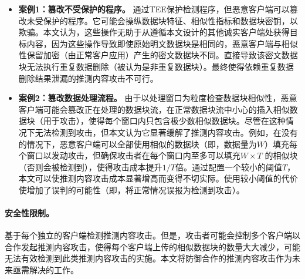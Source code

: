 \begin{itemize}[leftmargin=*]
    \item \textbf{案例1：篡改不受保护的程序。}
    \sysnameF 通过TEE保护检测程序，但恶意客户端可以篡改未受保护的程序。它可能会操纵数据块特征、相似性指标和数据块密钥，以欺骗\sysnameF。本文认为，这些操作无助于从遵循本文设计的其他诚实客户端处获得目标内容，因为这些操作导致即使原始明文数据块是相同的，恶意客户端与相似性保留加密（由正常客户应用）产生的密文数据块不同。直接导致该密文数据块无法执行重复数据删除（被认为是非重复数据块）。最终使得依赖重复数据删除结果泄漏的推测内容攻击不可行。
    \item \textbf{案例2：篡改数据处理流程。}
    由于\sysnameF 以处理窗口为粒度检查数据块相似性，恶意客户端可能会篡改正在处理的数据块流，在正常数据块流中小心的插入相似数据块（用于攻击），使得每个窗口内只包含极少数相似数据块。尽管\sysnameF 在这种情况下无法检测到攻击，但本文认为它显著缓解了推测内容攻击。例如，在没有\sysnameF 的情况下，恶意客户端可以全部使用相似的数据块（即，数据量为$W$）填充每个窗口以发动攻击，但\sysnameF 确保攻击者在每个窗口内至多可以填充$W\times T$ 的相似块（否则会被检测到），使得攻击成本提升$1/T$倍。通过配置一个较小的阈值$T$，本文可以使推测内容攻击成本显著增高而变得不切实际。使用较小阈值的代价使增加了误判的可能性（即，将正常情况误报为检测到攻击）。
\end{itemize}
  
\paragraph*{安全性限制。}\sysnameF 基于每个独立的客户端检测推测内容攻击。但是，攻击者可能会控制多个客户端以合作发起推测内容攻击，使得每个客户端上传的相似数据块的数量大大减少，\sysnameF 可能无法有效检测到此类推测内容攻击的实施。本文将防御合作的推测内容攻击作为未来亟需解决的工作。